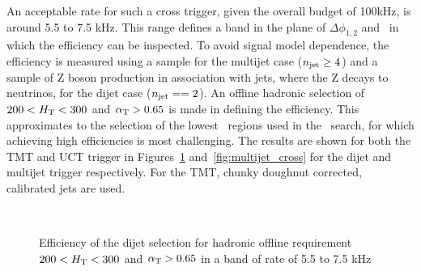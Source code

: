 An acceptable rate for such a cross trigger, given the overall budget of 100kHz, is 
around 5.5 to 7.5 kHz. This range defines a band in the plane of $\Delta\phi_{1,2}$
and \scalht~in which the efficiency can be inspected. To avoid signal model dependence, the 
efficiency is measured using a \ttbar sample for the multijet case ($n_{\mathrm{jet}} \ge 4$) and a sample  
of Z boson production in association with jets, where the Z decays to neutrinos, for the 
dijet case ($n_{\mathrm{jet}} == 2$). An offline hadronic selection of $200 < \mbox{$H_\text{T}$} < 300$ 
and $\alpha_{\text{T}} > 0.65$ is made in defining the efficiency. This approximates to the selection
of the lowest \scalht~regions used in the \alphat~search, for which achieving high efficiencies is most challenging.
The results are shown for both the TMT and UCT trigger in Figures~\ref{fig:dijet_cross} and~\ref{fig:multijet_cross} 
for the dijet and multijet trigger respectively. For the TMT, chunky doughnut corrected, calibrated jets are used.

\begin{figure}
\centering
	~
	\caption{Efficiency of the dijet selection for hadronic offline requirement $200 < \mbox{$H_\text{T}$} < 300$ and $\alpha_{\text{T}} > 0.65$
	in a band of rate of 5.5 to 7.5 kHz}
	    \label{fig:dijet_cross}
\end{figure}

